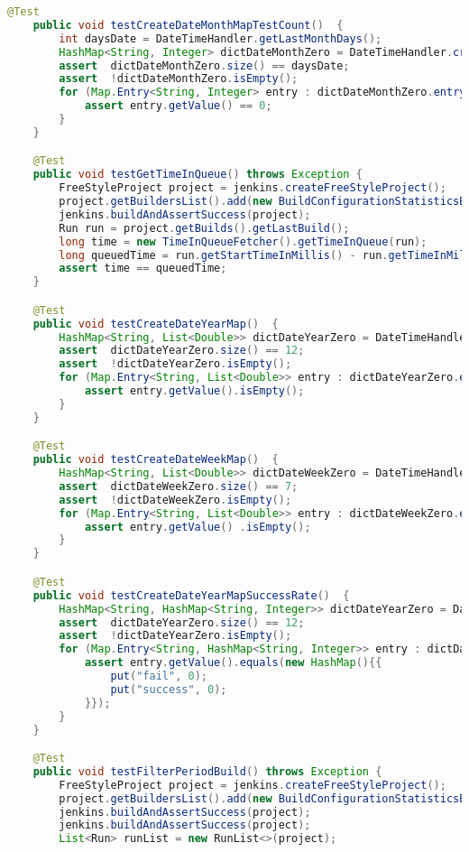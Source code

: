 \begin{lstlisting}[language=Java]
    @Test
    public void testCreateDateMonthMapTestCount()  {
        int daysDate = DateTimeHandler.getLastMonthDays();
        HashMap<String, Integer> dictDateMonthZero = DateTimeHandler.createDateMonthMapTestCount();
        assert  dictDateMonthZero.size() == daysDate;
        assert  !dictDateMonthZero.isEmpty();
        for (Map.Entry<String, Integer> entry : dictDateMonthZero.entrySet()) {
            assert entry.getValue() == 0;
        }
    }

    @Test
    public void testGetTimeInQueue() throws Exception {
        FreeStyleProject project = jenkins.createFreeStyleProject();
        project.getBuildersList().add(new BuildConfigurationStatisticsBuilder());
        jenkins.buildAndAssertSuccess(project);
        Run run = project.getBuilds().getLastBuild();
        long time = new TimeInQueueFetcher().getTimeInQueue(run);
        long queuedTime = run.getStartTimeInMillis() - run.getTimeInMillis();
        assert time == queuedTime;
    }

    @Test
    public void testCreateDateYearMap()  {
        HashMap<String, List<Double>> dictDateYearZero = DateTimeHandler.createDateYearMap();
        assert  dictDateYearZero.size() == 12;
        assert  !dictDateYearZero.isEmpty();
        for (Map.Entry<String, List<Double>> entry : dictDateYearZero.entrySet()) {
            assert entry.getValue().isEmpty();
        }
    }

    @Test
    public void testCreateDateWeekMap()  {
        HashMap<String, List<Double>> dictDateWeekZero = DateTimeHandler.createDateWeekMap();
        assert  dictDateWeekZero.size() == 7;
        assert  !dictDateWeekZero.isEmpty();
        for (Map.Entry<String, List<Double>> entry : dictDateWeekZero.entrySet()) {
            assert entry.getValue() .isEmpty();
        }
    }

    @Test
    public void testCreateDateYearMapSuccessRate()  {
        HashMap<String, HashMap<String, Integer>> dictDateYearZero = DateTimeHandler.createDateYearMapSuccessRate();
        assert  dictDateYearZero.size() == 12;
        assert  !dictDateYearZero.isEmpty();
        for (Map.Entry<String, HashMap<String, Integer>> entry : dictDateYearZero.entrySet()) {
            assert entry.getValue().equals(new HashMap(){{
                put("fail", 0);
                put("success", 0);
            }});
        }
    }

    @Test
    public void testFilterPeriodBuild() throws Exception {
        FreeStyleProject project = jenkins.createFreeStyleProject();
        project.getBuildersList().add(new BuildConfigurationStatisticsBuilder());
        jenkins.buildAndAssertSuccess(project);
        jenkins.buildAndAssertSuccess(project);
        List<Run> runList = new RunList<>(project);


\end{lstlisting}
